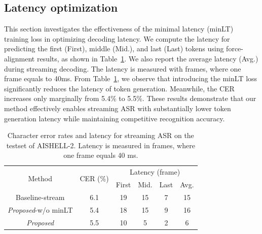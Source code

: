 \documentclass{article}
\begin{document}
\subsection{Latency optimization}
This section investigates the effectiveness of the minimal latency (minLT) training loss in optimizing decoding latency. We compute the latency for predicting the first (First), middle (Mid.), and last (Last) tokens using force-alignment results, as shown in Table~\ref{tab:tab4}. We also report the average latency (Avg.) during streaming decoding.
The latency is measured with frames,
where one frame equals to 40ms.
From Table~\ref{tab:tab4}, we observe that introducing the minLT loss significantly reduces the latency of token generation. Meanwhile, the CER increases only marginally from 5.4\% to 5.5\%. These results demonstrate that our method effectively enables streaming ASR with substantially lower token generation latency while maintaining competitive recognition accuracy.



\begin{table}[]
\caption{Character error rates and latency for streaming ASR
on the testset of AISHELL-2. 
Latency is measured in frames, where one frame equals 40 ms.
}
    \label{tab:tab4}
    \centering
    \begin{tabular}{c c c c c c}
    \hline
    \hline
    \multirow{2}{*}{Method}    & \multirow{2}{*}{CER (\%)} & \multicolumn{4}{c}{Latency (frame)} \\
    & & First & Mid. & Last & Avg. \\
    \hline
    Baseline-stream & 6.1 & 19 & 15 & 7 & 15 \\
    \emph{Proposed}-w/o minLT & 5.4 & 18 & 15 & 9 & 16 \\
    \hline
    \emph{Proposed}  & 5.5 & 10 & 5 & 2 & 6 \\
    \hline
    \hline
    \end{tabular}    
\end{table}
\end{document}
